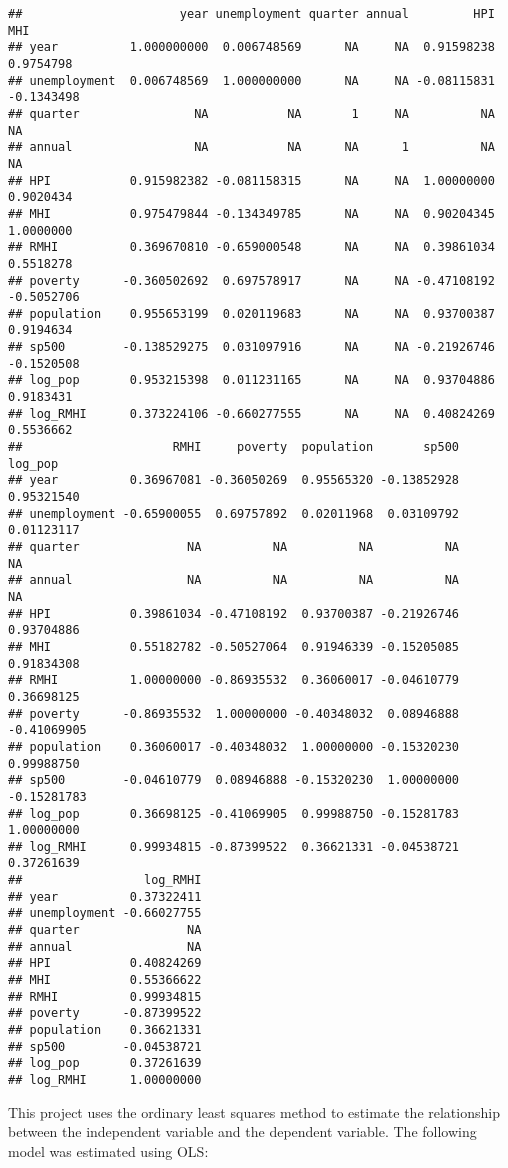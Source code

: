 \documentclass[
]{article}
\begin{document}
\begin{verbatim}
##                      year unemployment quarter annual         HPI        MHI
## year          1.000000000  0.006748569      NA     NA  0.91598238  0.9754798
## unemployment  0.006748569  1.000000000      NA     NA -0.08115831 -0.1343498
## quarter                NA           NA       1     NA          NA         NA
## annual                 NA           NA      NA      1          NA         NA
## HPI           0.915982382 -0.081158315      NA     NA  1.00000000  0.9020434
## MHI           0.975479844 -0.134349785      NA     NA  0.90204345  1.0000000
## RMHI          0.369670810 -0.659000548      NA     NA  0.39861034  0.5518278
## poverty      -0.360502692  0.697578917      NA     NA -0.47108192 -0.5052706
## population    0.955653199  0.020119683      NA     NA  0.93700387  0.9194634
## sp500        -0.138529275  0.031097916      NA     NA -0.21926746 -0.1520508
## log_pop       0.953215398  0.011231165      NA     NA  0.93704886  0.9183431
## log_RMHI      0.373224106 -0.660277555      NA     NA  0.40824269  0.5536662
##                     RMHI     poverty  population       sp500     log_pop
## year          0.36967081 -0.36050269  0.95565320 -0.13852928  0.95321540
## unemployment -0.65900055  0.69757892  0.02011968  0.03109792  0.01123117
## quarter               NA          NA          NA          NA          NA
## annual                NA          NA          NA          NA          NA
## HPI           0.39861034 -0.47108192  0.93700387 -0.21926746  0.93704886
## MHI           0.55182782 -0.50527064  0.91946339 -0.15205085  0.91834308
## RMHI          1.00000000 -0.86935532  0.36060017 -0.04610779  0.36698125
## poverty      -0.86935532  1.00000000 -0.40348032  0.08946888 -0.41069905
## population    0.36060017 -0.40348032  1.00000000 -0.15320230  0.99988750
## sp500        -0.04610779  0.08946888 -0.15320230  1.00000000 -0.15281783
## log_pop       0.36698125 -0.41069905  0.99988750 -0.15281783  1.00000000
## log_RMHI      0.99934815 -0.87399522  0.36621331 -0.04538721  0.37261639
##                 log_RMHI
## year          0.37322411
## unemployment -0.66027755
## quarter               NA
## annual                NA
## HPI           0.40824269
## MHI           0.55366622
## RMHI          0.99934815
## poverty      -0.87399522
## population    0.36621331
## sp500        -0.04538721
## log_pop       0.37261639
## log_RMHI      1.00000000
\end{verbatim}

This project uses the ordinary least squares method to estimate the
relationship between the independent variable and the dependent
variable. The following model was estimated using OLS:
\end{document}

